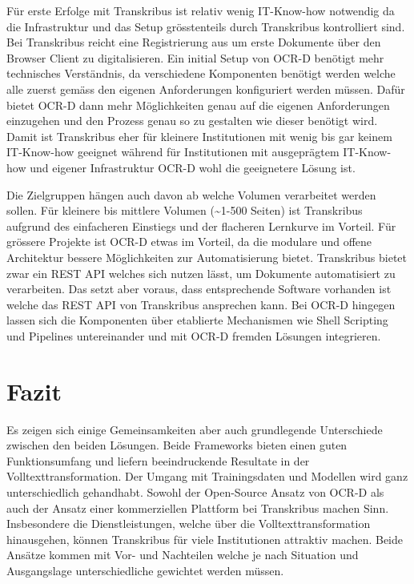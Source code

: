 \documentclass[a4paper,oneside, 12pt]{report}
\begin{document}
Für erste Erfolge mit Transkribus ist relativ wenig IT-Know-how notwendig da die Infrastruktur und das Setup grösstenteils durch Transkribus kontrolliert sind. Bei Transkribus reicht eine Registrierung aus um erste Dokumente über den Browser Client zu digitalisieren. Ein initial Setup von OCR-D benötigt mehr technisches Verständnis, da verschiedene Komponenten benötigt werden welche alle zuerst gemäss den eigenen Anforderungen konfiguriert werden müssen. Dafür bietet OCR-D dann mehr Möglichkeiten genau auf die eigenen Anforderungen einzugehen und den Prozess genau so zu gestalten wie dieser benötigt wird.  Damit ist Transkribus eher für kleinere Institutionen mit wenig bis gar keinem IT-Know-how geeignet während für Institutionen mit ausgeprägtem IT-Know-how und eigener Infrastruktur OCR-D wohl die geeignetere Lösung ist.

Die Zielgruppen hängen auch davon ab welche Volumen verarbeitet werden sollen. Für kleinere bis mittlere Volumen (\textasciitilde1-500 Seiten) ist Transkribus aufgrund des einfacheren Einstiegs und der flacheren Lernkurve im Vorteil. Für grössere Projekte ist OCR-D etwas im Vorteil, da die modulare und offene Architektur bessere Möglichkeiten zur Automatisierung bietet. Transkribus bietet zwar ein REST API welches sich nutzen lässt, um Dokumente automatisiert zu verarbeiten. Das setzt aber voraus, dass entsprechende Software vorhanden ist welche das REST API von Transkribus ansprechen kann. Bei OCR-D hingegen lassen sich die Komponenten über etablierte Mechanismen wie Shell Scripting und Pipelines untereinander und mit OCR-D fremden Lösungen integrieren.

\section{Fazit}
Es zeigen sich einige Gemeinsamkeiten aber auch grundlegende Unterschiede zwischen den beiden Lösungen. Beide Frameworks bieten einen guten Funktionsumfang und liefern beeindruckende Resultate in der Volltexttransformation. Der Umgang mit Trainingsdaten und Modellen wird ganz unterschiedlich gehandhabt. Sowohl der Open-Source Ansatz von OCR-D als auch der Ansatz einer kommerziellen Plattform bei Transkribus machen Sinn. Insbesondere die Dienstleistungen, welche über die Volltexttransformation hinausgehen, können Transkribus für viele Institutionen attraktiv machen. Beide Ansätze kommen mit Vor- und Nachteilen welche je nach Situation und Ausgangslage unterschiedliche gewichtet werden müssen. 
\end{document}
